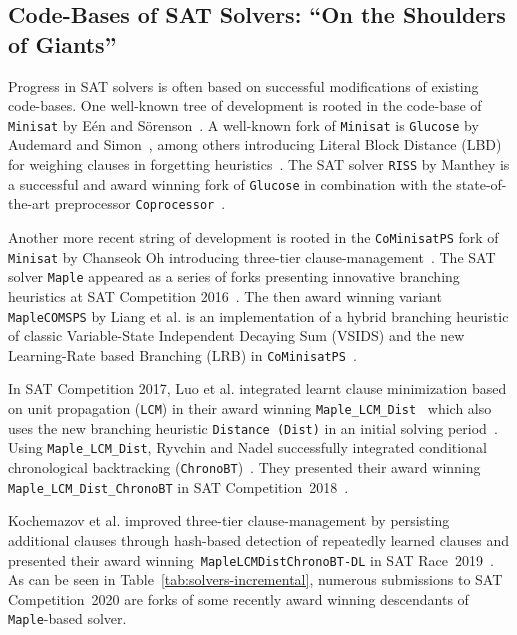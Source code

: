 \documentclass{elsarticle}
\newcommand{\solver}[1]{\texttt{#1}}
\begin{document}
\subsection{Code-Bases of SAT Solvers: ``On the Shoulders of Giants''}
\label{sec:codebases}

Progress in SAT solvers is often based on successful modifications of existing code-bases. 
One well-known tree of development is rooted in the code-base of \solver{Minisat} by Eén and Sörenson~\cite{Niklas:2003:Minisat}. 
A well-known fork of \solver{Minisat} is \solver{Glucose} by Audemard and Simon~\cite{Audemard:2018:Glucose}, among others introducing Literal Block Distance (LBD) for weighing clauses in forgetting heuristics~\cite{Audemard:2009:Glucose}. 
The SAT solver \solver{RISS} by Manthey is a successful and award winning fork of \solver{Glucose} in combination with the state-of-the-art preprocessor \solver{Coprocessor}~\cite{Manthey:2012:Coprocessor2}. 

Another more recent string of development is rooted in the \solver{CoMinisatPS} fork of \solver{Minisat} by Chanseok Oh introducing three-tier clause-management~\cite{Oh:2015:satunsat}. 
The SAT solver \solver{Maple} appeared as a series of forks presenting innovative branching heuristics at SAT Competition 2016~\cite{Liang:2016:LRB}. 
The then award winning variant \solver{MapleCOMSPS} by Liang et al. is an implementation of a hybrid branching heuristic of classic Variable-State Independent Decaying Sum (VSIDS) and the new Learning-Rate based Branching (LRB) in \solver{CoMinisatPS}~\cite{Liang:2016:MapleCOMSPS}. 

In SAT Competition 2017, Luo et al. integrated learnt clause minimization based on unit propagation (\solver{LCM}) in their award winning \solver{Maple\_LCM\_Dist}~\cite{Luo:2017:LCM} which also uses the new branching heuristic \solver{Distance (Dist)} in an initial solving period~\cite{Xiao:2017:MapleLCMDist}. 
Using \solver{Maple\_LCM\_Dist}, Ryvchin and Nadel successfully integrated conditional chronological backtracking (\solver{ChronoBT})~\cite{Nadel:2018:CBT}. 
They presented their award winning \solver{Maple\_LCM\_Dist\_ChronoBT} in SAT Competition~2018~\cite{Ryvchin:SC2018:MapleChronoBT}. 

Kochemazov et al. improved three-tier clause-management by persisting
additional clauses through hash-based detection of repeatedly learned clauses and presented their award winning~\solver{MapleLCMDistChronoBT-DL} in SAT Race~2019~\cite{Kochemazov:SC2019:MapleChronoBTDL}. 
As can be seen in Table~\ref{tab:solvers-incremental}, numerous submissions to SAT Competition~2020 are forks of some recently award winning descendants of \solver{Maple}-based solver. 
\end{document}
